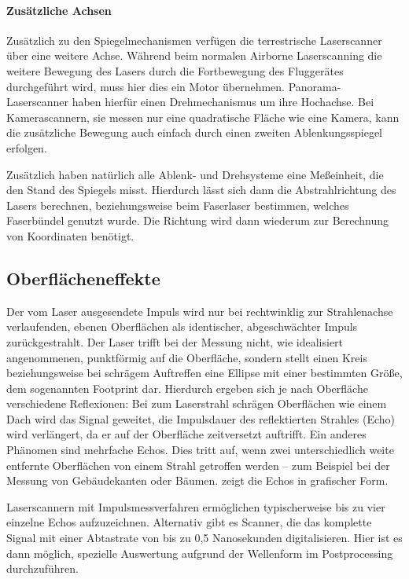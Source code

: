 \documentclass[a4paper,12pt,bibliography=totoc, listof=totoc,titlepage,pointlessnumbers]{scrreprt}
\begin{document}
\paragraph{Zusätzliche Achsen}
Zusätzlich zu den Spiegelmechanismen verfügen die terrestrische Laserscanner über eine weitere Achse. Während beim normalen Airborne Laserscanning die weitere Bewegung des Lasers durch die Fortbewegung des Fluggerätes durchgeführt wird, muss hier dies ein Motor übernehmen. Panorama-Laserscanner haben hierfür einen Drehmechanismus um ihre Hochachse. Bei Kamerascannern, sie messen nur eine quadratische Fläche wie eine Kamera, kann die zusätzliche Bewegung auch einfach durch einen zweiten Ablenkungsspiegel erfolgen. \citep[S. 37]{beraldin}

Zusätzlich haben natürlich alle Ablenk- und Drehsysteme eine Meßeinheit, die den Stand des Spiegels misst. Hierdurch lässt sich dann die Abstrahlrichtung des Lasers berechnen, beziehungsweise beim Faserlaser bestimmen, welches Faserbündel genutzt wurde. Die Richtung wird dann wiederum zur Berechnung von Koordinaten benötigt.


\subsection{Oberflächeneffekte}
Der vom Laser ausgesendete Impuls wird nur bei rechtwinklig zur Strahlenachse verlaufenden, ebenen Oberflächen als identischer, abgeschwächter Impuls zurückgestrahlt. Der Laser trifft bei der Messung nicht, wie idealisiert angenommenen, punktförmig auf die Oberfläche, sondern stellt einen Kreis beziehungsweise bei schrägem Auftreffen eine Ellipse mit einer bestimmten Größe, dem sogenannten Footprint dar. Hierdurch ergeben sich je nach Oberfläche verschiedene Reflexionen: Bei zum Laserstrahl schrägen Oberflächen wie einem Dach wird das Signal geweitet, die Impulsdauer des reflektierten Strahles (Echo) wird verlängert, da er auf der Oberfläche zeitversetzt auftrifft. Ein anderes Phänomen sind mehrfache Echos. Dies tritt auf, wenn zwei unterschiedlich weite entfernte Oberflächen von einem Strahl getroffen werden -- zum Beispiel bei der Messung von Gebäudekanten oder Bäumen.  zeigt die Echos in grafischer Form. \citep[S. 28]{beraldin}


Laserscannern mit Impulsmessverfahren ermöglichen typischerweise bis zu vier einzelne Echos aufzuzeichnen. Alternativ gibt es Scanner, die das komplette Signal mit einer Abtastrate von bis zu 0,5 Nanosekunden digitalisieren. Hier ist es dann möglich, spezielle Auswertung aufgrund der Wellenform im Postprocessing durchzuführen. \citep[S. 29]{beraldin}
\end{document}
